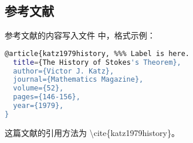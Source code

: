 \subsection{参考文献}
参考文献的内容写入文件  中，格式示例：
\begin{lstlisting}[language={sh},caption={参考文献格式示例}]
@article{katz1979history, %%% Label is here.
  title={The History of Stokes's Theorem},
  author={Victor J. Katz},
  journal={Mathematics Magazine},
  volume={52},
  pages={146-156},
  year={1979},
}
\end{lstlisting}

这篇文献的引用方法为 \textbackslash cite\{katz1979history\}。
